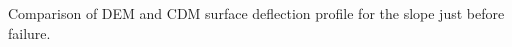 \label{fig:surfacedeflection} Comparison of DEM and CDM surface deflection profile for the slope just before failure.